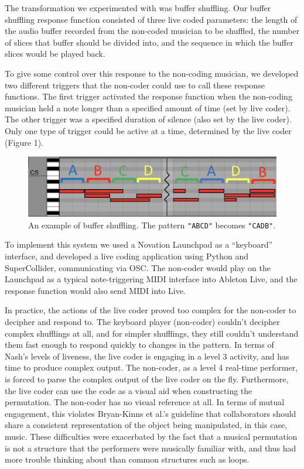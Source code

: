 \documentclass{nime-alternate}
\begin{document}
The transformation we experimented with was buffer shuffling. Our buffer shuffling response function consisted of three live coded parameters: the length of the audio buffer recorded from the non-coded musician to be shuffled, the number of slices that buffer should be divided into, and the sequence in which the buffer slices would be played back. 

To give some control over this response to the non-coding musician, we developed two different triggers that the non-coder could use to call these response functions. The first trigger activated the response function when the non-coding musician held a note longer than a specified amount of time (set by live coder). The other trigger was a specified duration of silence (also set by the live coder). Only one type of trigger could be active at a time, determined by the live coder (Figure 1).

\begin{figure}[htbp]
	\centering
		\includegraphics[width=1\columnwidth]{BufferShuffling2}
	\caption{An example of buffer shuffling. The pattern \texttt{"ABCD"} becomes \texttt{"CADB"}.}
	\label{fig:BufferShuffling2}
\end{figure}

To implement this system we used a Novation Launchpad as a ``keyboard'' interface, and developed a live coding application using Python and SuperCollider, communicating via OSC. The non-coder would play on the Launchpad as a typical note-triggering MIDI interface into Ableton Live, and the response function would also send MIDI into Live.

In practice, the actions of the live coder proved too complex for the non-coder to decipher and respond to. The keyboard player (non-coder) couldn't decipher complex shufflings at all, and for simpler shufflings, they still couldn't understand them fast enough to respond quickly to changes in the pattern. In terms of Nash's levels of liveness, the live coder is engaging in a level 3 activity, and has time to produce complex output. The non-coder, as a level 4 real-time performer, is forced to parse the complex output of the live coder on the fly. Furthermore, the live coder can use the code as a visual aid when constructing the permutation. The non-coder has no visual reference at all. In terms of mutual engagement, this violates Bryan-Kinns et al.'s guideline that collaborators should share a consistent representation of the object being manipulated, in this case, music. These difficulties were exacerbated by the fact that a musical permutation is not a structure that the performers were musically familiar with, and thus had more trouble thinking about than common structures such as loops.
\end{document}

